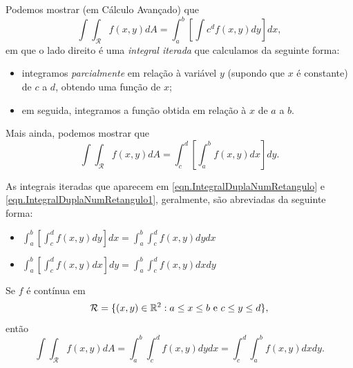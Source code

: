 \begin{example}
    Podemos mostrar (em Cálculo Avançado) que
        \begin{equation}\label{eqn.IntegralDuplaNumRetangulo}
            \int\int_\mathcal{R} f(x,y) dA = \int_a^b \left[ \int c^d f(x,y) dy \right] dx,
        \end{equation}
    em que o lado direito é uma \textit{integral iterada} que calculamos da seguinte forma:
        \begin{itemize}
            \item integramos \textit{parcialmente} em relação à variável \(y\) (supondo que \(x\) é constante) de \(c\) a \(d\), obtendo uma função de \(x\);
            \item em seguida, integramos a função obtida em relação à \(x\) de \(a\) a \(b\).
        \end{itemize}

    Mais ainda, podemos mostrar que
        \begin{equation}\label{eqn.IntegralDuplaNumRetangulo1}
            \int\int_\mathcal{R} f(x,y) dA = \int_c^d \left[ \int_a^b f(x,y) dx \right] dy.
        \end{equation}
\end{example}

As integrais iteradas que aparecem em \ref{eqn.IntegralDuplaNumRetangulo} e \ref{eqn.IntegralDuplaNumRetangulo1}, geralmente, são abreviadas da seguinte forma:
    \begin{itemize}
        \item \(\int_a^b \left[ \int_c^d f(x,y) dy \right] dx = \int_a^b \int_c^d f(x,y) dydx\)
        \item \(\int_a^b \left[ \int_c^d f(x,y) dx \right] dy = \int_a^b \int_c^d f(x,y) dxdy\)
    \end{itemize}

\begin{theorem}[Fubini]\label{thm.Fubini}
    Se \(f\) é contínua em \[\mathcal{R} = \{(x,y) \in\mathbb{R}^2 : a\leq x\leq b \text{ e } c\leq y\leq d\},\] então \[\int\int_\mathcal{R} f(x,y) dA = \int_a^b \int_c^d f(x,y) dy dx = \int_c^d \int_a^b f(x,y) dxdy.\]
\end{theorem}

